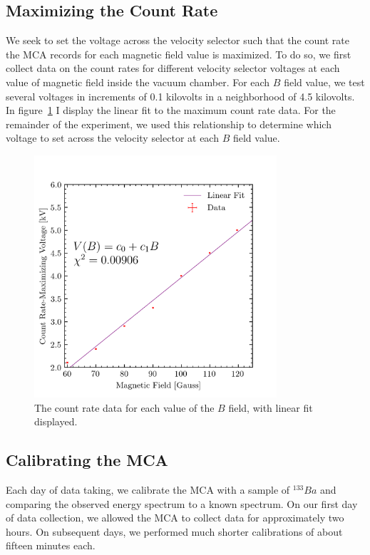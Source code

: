 \documentclass[aps,twocolumn,secnumarabic,balancelastpage,amsmath,amssymb,nofootinbib, floatfix]{revtex4-2}
\begin{document}
	\subsection{Maximizing the Count Rate}
	We seek to set the voltage across the velocity selector such that the count rate the MCA records for each magnetic field value is maximized. To do so, we first collect data on the count rates for different velocity selector voltages at each value of magnetic field inside the vacuum chamber. For each $B$ field value, we test several voltages in increments of 0.1 kilovolts in a neighborhood of 4.5 kilovolts. 
	In figure~\ref{fig:countrate} I display the linear fit to the maximum count rate data. For the remainder of the experiment, we used this relationship to determine which voltage to set across the velocity selector at each $B$ field value.
	
	\begin{figure}[h]
		\centering
		\includegraphics[width=9cm]{count_rate_max.png}
		\caption{The count rate data for each value of the $B$ field, with linear fit displayed.}
		\label{fig:countrate}
	\end{figure}
	
	\subsection{Calibrating the MCA}
	Each day of data taking, we calibrate the MCA with a sample of $^{133}Ba$ and comparing the observed energy spectrum to a known spectrum. On our first day of data collection, we allowed the MCA to collect data for approximately two hours. On subsequent days, we performed much shorter calibrations of about fifteen minutes each. 
	
\end{document}
